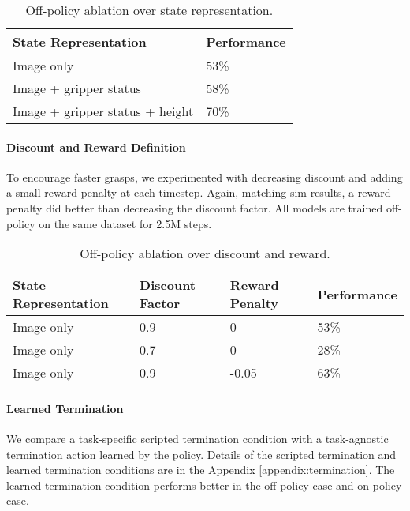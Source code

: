 \documentclass{article}
\begin{document}
\begin{table}[h]
\begin{center}
\begin{tabular}{ |p{12em}|p{7em}| } 
\hline
State Representation & Performance \\
\hline
Image only & 53\% \\ %
\hline
Image + gripper status & 58\% \\ %
\hline
Image + gripper status + height & 70\% \\ %
\hline
\end{tabular}
\end{center}
\caption{Off-policy ablation over state representation.}
\label{table:state-repr-ablation}
\vspace{-0.25in}
\end{table}\paragraph{Discount and Reward Definition}
To encourage faster grasps, we experimented with decreasing discount and adding a small reward penalty at each timestep. Again, matching sim results, a reward penalty did better than decreasing the discount factor. All models are trained off-policy on the same dataset for 2.5M steps.
\begin{table}[h]
\label{table:learning-ablation}
\begin{center}
\begin{tabular}{|p{12em}|p{7em}|p{7em}|p{7em}|}
\hline
State Representation & Discount Factor & Reward Penalty & Performance  \\
\hline
Image only & 0.9 & 0 & 53\% \\ %
\hline
Image only & 0.7 & 0 & 28\% \\ %
\hline
Image only & 0.9 & -0.05 & 63\% \\ %
\hline
\end{tabular}
\end{center}
\caption{Off-policy ablation over discount and reward.}
\vspace{-0.3in}
\end{table}\paragraph{Learned Termination}
We compare a task-specific scripted termination condition with a task-agnostic termination action learned by the policy. Details of the scripted termination and learned termination conditions are in the Appendix \ref{appendix:termination}. The learned termination condition performs better in the off-policy case and on-policy case.
 
\end{document}
